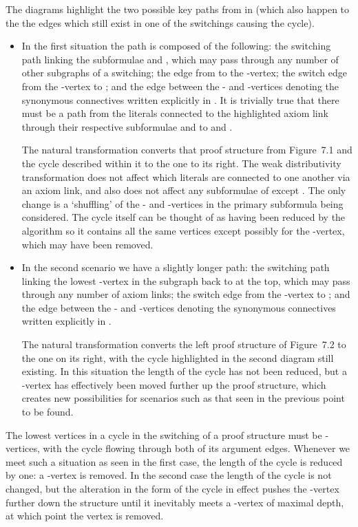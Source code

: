 \documentclass{LMCS}
\theoremstyle{plain}\newtheorem*{cLm}{Claim}
\newcommand{\p}{} \newcommand{\N}{\mathbb{N}}
\begin{document}
    \p The diagrams highlight the two possible key paths from  in  (which also happen to the the edges which still exist in one of the switchings causing the cycle).
    
    \begin{itemize}
    
    \item In the first situation the path is composed of the following: the switching path linking the subformulae  and , which may pass through any number of other subgraphs of a switching; the edge from  to the -vertex; the switch edge from the -vertex to ; and the edge between the - and -vertices denoting the synonymous connectives written explicitly in . It is trivially true that there must be a path from the literals connected to the highlighted axiom link through their respective subformulae  and  to  and .
    
    \p The natural transformation  converts that proof structure from Figure~7.1 and the cycle described within it to the one to its right. The weak distributivity transformation does not affect which literals are connected to one another via an axiom link, and also does not affect any subformulae of  except . The only change is a `shuffling' of the - and -vertices in the primary subformula being considered. The cycle itself can be thought of as having been reduced by the algorithm so it contains all the same vertices except possibly for the -vertex, which may have been removed.
    
    \item In the second scenario we have a slightly longer path: the switching path linking the lowest -vertex in the subgraph back to  at the top, which may pass through any number of axiom links; the switch edge from the -vertex to ; and the edge between the - and -vertices denoting the synonymous connectives written explicitly in .
    
    \p The natural transformation  converts the left proof structure of Figure~7.2 to the one on its right, with the cycle highlighted in the second diagram still existing. In this situation the length of the cycle has not been reduced, but a -vertex has effectively been moved further up the proof structure, which creates new possibilities for scenarios such as that seen in the previous point to be found. 
    
    \end{itemize}
    
\noindent    The lowest vertices in a cycle in the switching of a proof structure must be -vertices, with the cycle flowing through both of its argument edges. Whenever we meet such a situation as seen in the first case, the length of the cycle is reduced by one: a -vertex is removed. In the second case the length of the cycle is not changed, but the alteration in the form of the cycle in effect pushes the -vertex further down the structure until it inevitably meets a -vertex of maximal depth, at which point the vertex is removed.
    
\end{document}
